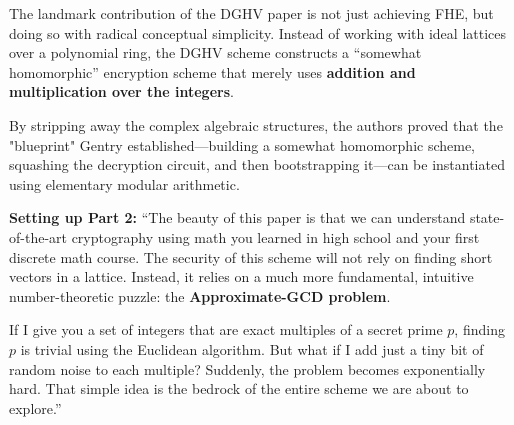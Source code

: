 The landmark contribution of the DGHV paper is not just achieving FHE, but doing so with radical conceptual simplicity. Instead of working with ideal lattices over a polynomial ring, the DGHV scheme constructs a ``somewhat homomorphic'' encryption scheme that merely uses \textbf{addition and multiplication over the integers}. 

By stripping away the complex algebraic structures, the authors proved that the "blueprint" Gentry established—building a somewhat homomorphic scheme, squashing the decryption circuit, and then bootstrapping it—can be instantiated using elementary modular arithmetic. 

\begin{speakernote}
\textbf{Setting up Part 2:}
``The beauty of this paper is that we can understand state-of-the-art cryptography using math you learned in high school and your first discrete math course. The security of this scheme will not rely on finding short vectors in a lattice. Instead, it relies on a much more fundamental, intuitive number-theoretic puzzle: the \textbf{Approximate-GCD problem}. 

If I give you a set of integers that are exact multiples of a secret prime $p$, finding $p$ is trivial using the Euclidean algorithm. But what if I add just a tiny bit of random noise to each multiple? Suddenly, the problem becomes exponentially hard. That simple idea is the bedrock of the entire scheme we are about to explore.''
\end{speakernote}

